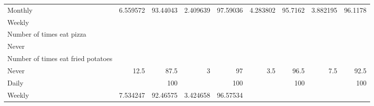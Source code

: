 \documentclass{article}
\begin{document}
\begin{tabular}{lllllllll}
\multicolumn{1}{l}{\hspace{7em}Monthly} &
  \multicolumn{1}{|r}{6.559572} &
  \multicolumn{1}{r}{93.44043} &
  \multicolumn{1}{r}{2.409639} &
  \multicolumn{1}{r}{97.59036} &
  \multicolumn{1}{r}{4.283802} &
  \multicolumn{1}{r}{95.7162} &
  \multicolumn{1}{r}{3.882195} &
  \multicolumn{1}{r}{96.1178} \\
\multicolumn{1}{l}{\hspace{3em}Weekly} &
  \multicolumn{1}{|r}{} &
  \multicolumn{1}{r}{} &
  \multicolumn{1}{r}{} &
  \multicolumn{1}{r}{} &
  \multicolumn{1}{r}{} &
  \multicolumn{1}{r}{} &
  \multicolumn{1}{r}{} &
  \multicolumn{1}{r}{} \\
\multicolumn{1}{l}{\hspace{4em}Number of times eat pizza} &
  \multicolumn{1}{|r}{} &
  \multicolumn{1}{r}{} &
  \multicolumn{1}{r}{} &
  \multicolumn{1}{r}{} &
  \multicolumn{1}{r}{} &
  \multicolumn{1}{r}{} &
  \multicolumn{1}{r}{} &
  \multicolumn{1}{r}{} \\
\multicolumn{1}{l}{\hspace{5em}Never} &
  \multicolumn{1}{|r}{} &
  \multicolumn{1}{r}{} &
  \multicolumn{1}{r}{} &
  \multicolumn{1}{r}{} &
  \multicolumn{1}{r}{} &
  \multicolumn{1}{r}{} &
  \multicolumn{1}{r}{} &
  \multicolumn{1}{r}{} \\
\multicolumn{1}{l}{\hspace{6em}Number of times eat fried potatoes} &
  \multicolumn{1}{|r}{} &
  \multicolumn{1}{r}{} &
  \multicolumn{1}{r}{} &
  \multicolumn{1}{r}{} &
  \multicolumn{1}{r}{} &
  \multicolumn{1}{r}{} &
  \multicolumn{1}{r}{} &
  \multicolumn{1}{r}{} \\
\multicolumn{1}{l}{\hspace{7em}Never} &
  \multicolumn{1}{|r}{12.5} &
  \multicolumn{1}{r}{87.5} &
  \multicolumn{1}{r}{3} &
  \multicolumn{1}{r}{97} &
  \multicolumn{1}{r}{3.5} &
  \multicolumn{1}{r}{96.5} &
  \multicolumn{1}{r}{7.5} &
  \multicolumn{1}{r}{92.5} \\
\multicolumn{1}{l}{\hspace{7em}Daily} &
  \multicolumn{1}{|r}{} &
  \multicolumn{1}{r}{100} &
  \multicolumn{1}{r}{} &
  \multicolumn{1}{r}{100} &
  \multicolumn{1}{r}{} &
  \multicolumn{1}{r}{100} &
  \multicolumn{1}{r}{} &
  \multicolumn{1}{r}{100} \\
\multicolumn{1}{l}{\hspace{7em}Weekly} &
  \multicolumn{1}{|r}{7.534247} &
  \multicolumn{1}{r}{92.46575} &
  \multicolumn{1}{r}{3.424658} &
  \multicolumn{1}{r}{96.57534} &

\end{tabular}
\end{document}

